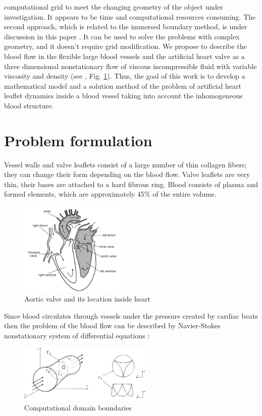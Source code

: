 \documentclass[conference]{IEEEtran}
\begin{document}
computational grid to meet the changing geometry of the object under 
investigation. It appears to be time and computational resources consuming.
The second approach, which is related to the immersed boundary method, is 
under discussion in this paper \cite{pescin_2002, griffith_2011, ma_x_2013, jian}. It can be used to solve the problems with 
complex geometry, and it doesn't require grid modification.
We propose to describe the blood flow in the flexible large blood vessels and the 
artificial heart valve as a three dimensional nonstationary flow of viscous 
incompressible fluid with variable viscosity and density (see \cite{gummel, geidarov, milosevic, dolgov}, Fig. \ref{fig:heart_scheme}).
Thus, the goal of this work is to develop a mathematical model and a solution 
method of the problem of artificial heart leaflet dynamics inside a blood vessel 
taking into account the inhomogeneous blood structure.

\section{Problem formulation}
Vessel walls and valve leaflets consist of a large number of thin collagen fibers; 
they can change their form depending on the blood flow. Valve leaflets are very 
thin, their bases are attached to a hard fibrous ring. Blood consists of plasma and 
formed elements, which are approximately 45\% of the entire volume.

\begin{figure}[!t]
\centering
\includegraphics[width=2.0in]{images/heart_scheme.png}
\caption{Aortic valve and its location inside heart}
\label{fig:heart_scheme}
\end{figure}

Since blood circulates through vessels under the pressure created by cardiac 
beats then the problem of the blood flow can be described by Navier-Stokes 
nonstationary system of differential equations \cite{gummel}:

\begin{figure}[!t]
\centering
\includegraphics[width=2.5in]{images/area_3d.png}
\caption{Computational domain boundaries}
\label{fig:area_3d}
\end{figure}
\end{document}
